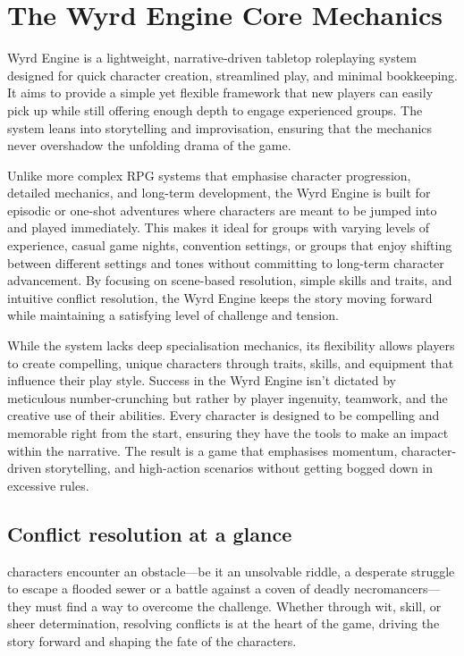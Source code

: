 \chapter{The Wyrd Engine Core Mechanics}

 Wyrd Engine is a lightweight, narrative-driven tabletop roleplaying system designed for quick character creation, streamlined play, and minimal bookkeeping. It aims to provide a simple yet flexible framework that new players can easily pick up while still offering enough depth to engage experienced groups. The system leans into storytelling and improvisation, ensuring that the mechanics never overshadow the unfolding drama of the game.

Unlike more complex RPG systems that emphasise character progression, detailed mechanics, and long-term development, the Wyrd Engine is built for episodic or one-shot adventures where characters are meant to be jumped into and played immediately. This makes it ideal for groups with varying levels of experience, casual game nights, convention settings, or groups that enjoy shifting between different settings and tones without committing to long-term character advancement. By focusing on scene-based resolution, simple skills and traits, and intuitive conflict resolution, the Wyrd Engine keeps the story moving forward while maintaining a satisfying level of challenge and tension.

While the system lacks deep specialisation mechanics, its flexibility allows players to create compelling, unique characters through traits, skills, and equipment that influence their play style. Success in the Wyrd Engine isn’t dictated by meticulous number-crunching but rather by player ingenuity, teamwork, and the creative use of their abilities. Every character is designed to be compelling and memorable right from the start, ensuring they have the tools to make an impact within the narrative. The result is a game that emphasises momentum, character-driven storytelling, and high-action scenarios without getting bogged down in excessive rules.

\section{Conflict resolution at a glance}

 characters encounter an obstacle—be it an unsolvable riddle, a desperate struggle to escape a flooded sewer or a battle against a coven of deadly necromancers—they must find a way to overcome the challenge. Whether through wit, skill, or sheer determination, resolving conflicts is at the heart of the game, driving the story forward and shaping the fate of the characters.

